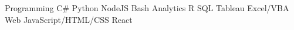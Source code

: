 

\begin{cvskills}

    \cvskill
        {Programming} %
        {C#{\enskip\cdotp\enskip}
        Python{\enskip\cdotp\enskip}
        NodeJS{\enskip\cdotp\enskip}
        Bash} %
    \cvskill
        {Analytics} %
        {R{\enskip\cdotp\enskip}
        SQL{\enskip\cdotp\enskip}
        Tableau{\enskip\cdotp\enskip}
        Excel/VBA}
    \cvskill
        {Web} %
        {JavaScript/HTML/CSS{\enskip\cdotp\enskip}
        React}

\end{cvskills}